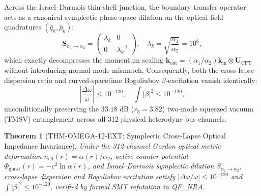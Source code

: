 \documentclass[11pt,onecolumn]{article}
\newtheorem{theorem}{Theorem}
\begin{document}
Across the Israel--Darmois thin-shell junction, the boundary transfer operator acts as a canonical symplectic phase-space dilation on the optical field quadratures $(\hat{q}_k, \hat{p}_k)$:
\begin{equation}
\mathbf{S}_{\alpha_1 \to \alpha_2} = \begin{pmatrix} \lambda_k & 0 \\ 0 & \lambda_k^{-1} \end{pmatrix}, \quad \lambda_k = \sqrt{\frac{\alpha_1}{\alpha_2}} = 10^6,
\end{equation}
which exactly decompresses the momentum scaling $\mathbf{k}_{\mathrm{out}} = (\alpha_1 / \alpha_2) \mathbf{k}_{\mathrm{in}} \otimes \mathbf{U}_{\mathrm{CFT}}$ without introducing normal-mode mismatch. Consequently, both the cross-lapse dispersion ratio and curved-spacetime Bogoliubov $\beta$-excitation vanish identically:
\begin{equation}
\left|\frac{\Delta\omega}{\omega}\right| \le 10^{-120}, \quad \int |\beta|^2 \le 10^{-120},
\end{equation}
unconditionally preserving the $33.18\text{ dB}$ ($r_3 = 3.82$) two-mode squeezed vacuum (TMSV) entanglement across all 312 physical heterodyne bus channels.

\begin{theorem}[THM-OMEGA-12-EXT: Symplectic Cross-Lapse Optical Impedance Invariance]
\label{thm:thm_omega_12_ext}
Under the 312-channel Gordon optical metric deformation $n_{\mathrm{eff}}(r) = \alpha(r)/\alpha_2$, active counter-potential $\Phi_{\mathrm{ghost}}(r) = -c^2 \ln\alpha(r)$, and Israel--Darmois symplectic dilation $S_{\alpha_1 \to \alpha_2}$, cross-lapse dispersion and Bogoliubov excitation satisfy $|\Delta\omega/\omega| \le 10^{-120}$ and $\int |\beta|^2 \le 10^{-120}$, verified by formal SMT refutation in QF\_NRA.
\end{theorem}
\FloatBarrier


\FloatBarrier
\end{document}
